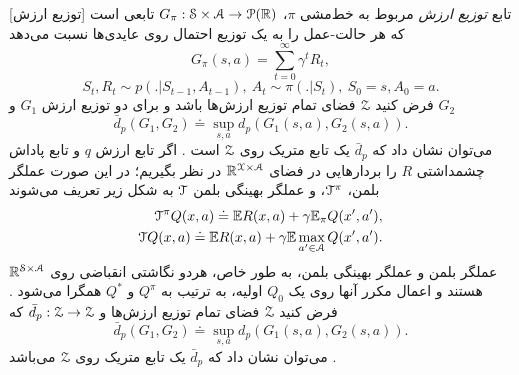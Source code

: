[توزیع ارزش]
تابع 
\textit{توزیع ارزش}
مربوط به خط‌مشی $\pi$،
$G_\pi : \EuScript{S} \times \EuScript{A} \to \EuScript{P}(\mathbb{R})$
تابعی است که هر حالت-عمل را به یک توزیع احتمال روی عایدی‌ها نسبت می‌دهد
$$G_\pi(s,a) = \sum_{t=0}^{\infty} \gamma^t R_t, $$
$$S_t, R_t \sim p(.|S_{t-1}, A_{t-1}), \  A_t \sim \pi(.|S_t), \  S_0 = s, A_0=a.$$ 
فرض کنید 
 $\EuScript{Z}$
  فضای تمام توزیع ارزش‌ها باشد و برای دو توزیع ارزش
  $G_1$
  و
  $G_2$
$$\bar{d}_p(G_1, G_2) \doteq \sup_{s,a} d_p(G_1(s,a), G_2(s,a)).$$
می‌توان نشان داد که $\bar{d}_p$ یک تابع متریک روی $\EuScript{Z}$ است
\cite{bellemare2017distributional}.
اگر تابع ارزش $q$ و تابع پاداش چشمداشتی $R$ را بردارهایی در فضای 
$\mathbb{R}^{\EuScript{X \times A}}$ 
در نظر بگیریم؛ در این صورت عملگر بلمن، $\EuScript{T}^\pi$، و عملگر بهینگی بلمن $\EuScript{T}$ به شکل زیر تعریف می‌شوند
\begin{align}
\EuScript{T}^\pi Q(x,a) \doteq \mathbb{E} R(x,a) + \gamma \mathbb{E}_\pi Q(x',a'), \\ \nonumber
\EuScript{T} Q(x,a) \doteq \mathbb{E} R(x,a) + \gamma \mathbb{E} \max_{a' \in \EuScript{A}} Q(x',a'). \nonumber
\end{align}
عملگر بلمن و عملگر بهینگی بلمن، به طور خاص، هردو نگاشتی انقباضی روی
$\mathbb{R}^{\EuScript{S} \times \EuScript{A}}$
هستند و اعمال مکرر آنها روی یک $Q_0$ اولیه، به ترتیب به $Q^\pi$ و $Q^*$ همگرا می‌شود \cite{bertsekas1996neuro}.
فرض کنید 
$\EuScript{Z}$
فضای تمام توزیع ارزش‌ها و
$\bar{d}_p: \EuScript{Z} \to \EuScript{Z}$
که
$$\bar{d}_p(G_1, G_2) \doteq \sup_{s,a} d_p(G_1(s,a), G_2(s,a)).$$
می‌توان نشان داد که $\bar{d}_p$ یک تابع متریک روی $\EuScript{Z}$ می‌باشد
\cite{bellemare2017distributional}.

%
%

%

